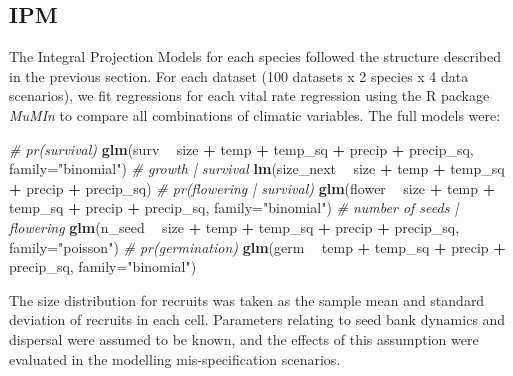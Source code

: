 \documentclass[]{article}
\newenvironment{Shaded}{\begin{snugshade}}{\end{snugshade}}
\newcommand{\CommentTok}[1]{\textcolor[rgb]{0.56,0.35,0.01}{\textit{#1}}}
\newcommand{\DataTypeTok}[1]{\textcolor[rgb]{0.13,0.29,0.53}{#1}}
\newcommand{\KeywordTok}[1]{\textcolor[rgb]{0.13,0.29,0.53}{\textbf{#1}}}
\newcommand{\NormalTok}[1]{#1}
\newcommand{\OperatorTok}[1]{\textcolor[rgb]{0.81,0.36,0.00}{\textbf{#1}}}
\newcommand{\StringTok}[1]{\textcolor[rgb]{0.31,0.60,0.02}{#1}}
\begin{document}
\subsection{IPM}

The Integral Projection Models for each species followed the structure
described in the previous section. For each dataset (100 datasets x 2
species x 4 data scenarios), we fit regressions for each vital rate
regression using the R package \emph{MuMIn} to compare all combinations
of climatic variables. The full models were:

\begin{Shaded}
\begin{Highlighting}[]
\CommentTok{# pr(survival)}
\KeywordTok{glm}\NormalTok{(surv }\OperatorTok{~}\StringTok{ }\NormalTok{size }\OperatorTok{+}\StringTok{ }\NormalTok{temp }\OperatorTok{+}\StringTok{ }\NormalTok{temp_sq }\OperatorTok{+}\StringTok{ }\NormalTok{precip }\OperatorTok{+}\StringTok{ }\NormalTok{precip_sq, }\DataTypeTok{family=}\StringTok{"binomial"}\NormalTok{)}
\CommentTok{# growth | survival}
\KeywordTok{lm}\NormalTok{(size_next }\OperatorTok{~}\StringTok{ }\NormalTok{size }\OperatorTok{+}\StringTok{ }\NormalTok{temp }\OperatorTok{+}\StringTok{ }\NormalTok{temp_sq }\OperatorTok{+}\StringTok{ }\NormalTok{precip }\OperatorTok{+}\StringTok{ }\NormalTok{precip_sq)}
\CommentTok{# pr(flowering | survival)}
\KeywordTok{glm}\NormalTok{(flower }\OperatorTok{~}\StringTok{ }\NormalTok{size }\OperatorTok{+}\StringTok{ }\NormalTok{temp }\OperatorTok{+}\StringTok{ }\NormalTok{temp_sq }\OperatorTok{+}\StringTok{ }\NormalTok{precip }\OperatorTok{+}\StringTok{ }\NormalTok{precip_sq, }\DataTypeTok{family=}\StringTok{"binomial"}\NormalTok{)}
\CommentTok{# number of seeds | flowering}
\KeywordTok{glm}\NormalTok{(n_seed }\OperatorTok{~}\StringTok{ }\NormalTok{size }\OperatorTok{+}\StringTok{ }\NormalTok{temp }\OperatorTok{+}\StringTok{ }\NormalTok{temp_sq }\OperatorTok{+}\StringTok{ }\NormalTok{precip }\OperatorTok{+}\StringTok{ }\NormalTok{precip_sq, }\DataTypeTok{family=}\StringTok{"poisson"}\NormalTok{)}
\CommentTok{# pr(germination)}
\KeywordTok{glm}\NormalTok{(germ }\OperatorTok{~}\StringTok{ }\NormalTok{temp }\OperatorTok{+}\StringTok{ }\NormalTok{temp_sq }\OperatorTok{+}\StringTok{ }\NormalTok{precip }\OperatorTok{+}\StringTok{ }\NormalTok{precip_sq, }\DataTypeTok{family=}\StringTok{"binomial"}\NormalTok{)}
\end{Highlighting}
\end{Shaded}

The size distribution for recruits was taken as the sample mean and
standard deviation of recruits in each cell. Parameters relating to seed
bank dynamics and dispersal were assumed to be known, and the effects of
this assumption were evaluated in the modelling mis-specification
scenarios.
\end{document}
